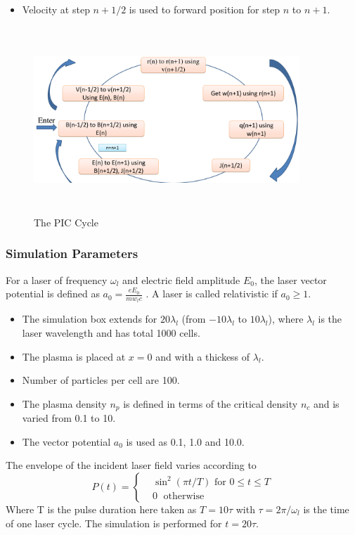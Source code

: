 \documentclass{beamer}
\begin{document}
\begin{frame}
    \small
    \begin{itemize}
        \item Velocity at step $n+1/2$ is used to forward position for step $n$ to $n+1$.
    \end{itemize}
    \begin{figure}
        \includegraphics[width=10cm, height=7cm]{PIC.png}
        \centering
        \caption{The PIC Cycle}
    \end{figure}
\end{frame}
\begin{frame}
    \small
    \frametitle{Simulation Parameters}
    For a laser of frequency $\omega_l$ and electric field amplitude $E_0$, the laser vector potential is defined as
    $
        a_0 = \frac{eE_0}{m w_l c}
    $
    . A laser is called relativistic if $a_0 \ge 1$.
    \begin{itemize}
        \item The simulation box extends for $20 \lambda _l$ (from $-10 \lambda _l$ to $10 \lambda _l$), where $\lambda_l$ is the laser wavelength and has total 1000 cells.
        \item  The plasma is placed at $x=0$ and with a thickess of $\lambda_l$.
        \item  Number of particles per cell are 100.
        \item The plasma density $n_p$ is defined in terms of the critical density $n_c$ and is varied from 0.1 to 10.
        \item The vector potential $a_0$ is used as 0.1, 1.0 and 10.0.
    \end{itemize}
    The envelope of the incident laser field varies according to
    \begin{equation}
        P(t)=
        \begin{cases}
             & \sin^2(\pi t/T) \text{ for } 0 \leq t \le T \\
             & 0         \;      \text{ otherwise }
        \end{cases}
    \end{equation}
    Where T is the pulse duration here taken as $T=10\tau$ with $\tau = 2\pi/\omega_l$ is the time of one laser cycle. The simulation is performed for $t=20\tau$.
\end{frame}
\end{document}
